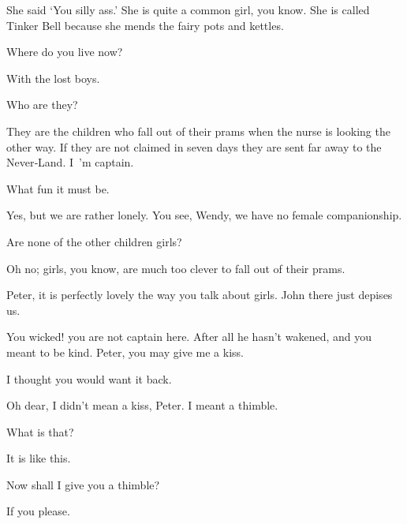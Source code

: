 \begin{drama}
\peterspeaks
She said ‘You silly ass.’
She is quite a common girl, you know.
She is called Tinker Bell because she mends the fairy pots and kettles.


\wendyspeaks
Where do you live now?

\peterspeaks
With the lost boys.

\wendyspeaks
Who are they?

\peterspeaks
They are the children who fall out of their prams when the nurse is looking the other way.
If they are not claimed in seven days they are sent far away to the Never‐Land.
I~’m captain.

\wendyspeaks
What fun it must be.

Yes, but we are rather lonely.
You see, Wendy, we have no female companionship.

\wendyspeaks
Are none of the other children girls?

\peterspeaks
Oh no; girls, you know, are much too clever to fall out of their prams.

\wendyspeaks
Peter, it is perfectly lovely the way you talk about girls.
John there just depises us.


You wicked!
you are not captain here.
After all he hasn’t wakened, and you meant to be kind.
Peter, you may give me a kiss.

I thought you would want it back.

Oh dear, I didn’t mean a kiss, Peter.
I meant a thimble.

What is that?

\wendyspeaks
It is like this.

Now shall I give you a thimble?

\wendyspeaks
If you please.


\end{drama}
